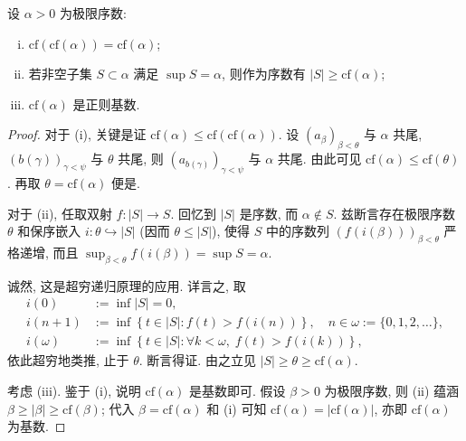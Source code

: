\begin{proposition}\label{prop:cf-generalities}
	设 $\alpha > 0$ 为极限序数:
	\begin{enumerate}[(i)]
		\item $\mathrm{cf}(\mathrm{cf}(\alpha)) = \mathrm{cf}(\alpha)$;
		\item 若非空子集 $S \subset \alpha$ 满足 $\sup S = \alpha$, 则作为序数有 $|S| \geq \mathrm{cf}(\alpha)$;
		\item $\mathrm{cf}(\alpha)$ 是正则基数.
	\end{enumerate}
\end{proposition}
\begin{proof}
	对于 (i), 关键是证 $\mathrm{cf}(\alpha) \leq \mathrm{cf}(\mathrm{cf}(\alpha))$. 设 $(a_\beta)_{\beta < \theta}$ 与 $\alpha$ 共尾, $(b(\gamma))_{\gamma < \psi}$ 与 $\theta$ 共尾, 则 $\left(a_{b(\gamma)}\right)_{\gamma < \psi}$ 与 $\alpha$ 共尾. 由此可见 $\mathrm{cf}(\alpha) \leq \mathrm{cf}(\theta)$. 再取 $\theta = \mathrm{cf}(\alpha)$ 便是.
	
	对于 (ii), 任取双射 $f: |S| \to S$. 回忆到 $|S|$ 是序数, 而 $\alpha \notin S$. 兹断言存在极限序数 $\theta$ 和保序嵌入 $i: \theta \hookrightarrow |S|$ (因而 $\theta \leq |S|$), 使得 $S$ 中的序数列 $\left( f(i(\beta)) \right)_{\beta < \theta}$ 严格递增, 而且 $\sup_{\beta < \theta} f(i(\beta)) = \sup S = \alpha$.
	
	诚然, 这是超穷递归原理的应用. 详言之, 取
	\begin{align*}
		i(0) & := \inf |S| = 0, \\
		i(n+1) & := \inf\left\{ t \in |S|: f(t) > f(i(n)) \right\}, \quad n \in \omega := \{0, 1, 2, \ldots\}, \\
		i(\omega) & := \inf\left\{ t \in |S|: \forall k < \omega, \; f(t) > f(i(k)) \right\},
	\end{align*}
	依此超穷地类推, 止于 $\theta$. 断言得证. 由之立见 $|S| \geq \theta \geq \mathrm{cf}(\alpha)$.
	
	考虑 (iii). 鉴于 (i), 说明 $\mathrm{cf}(\alpha)$ 是基数即可. 假设 $\beta > 0$ 为极限序数, 则 (ii) 蕴涵 $\beta \geq |\beta| \geq \mathrm{cf}(\beta)$; 代入 $\beta = \mathrm{cf}(\alpha)$ 和 (i) 可知 $\mathrm{cf}(\alpha) = |\mathrm{cf}(\alpha)|$, 亦即 $\mathrm{cf}(\alpha)$ 为基数.
\end{proof}

